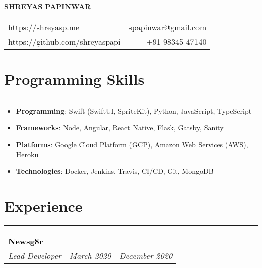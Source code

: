 \documentclass[a4paper,6pt]{article}
\begin{document}
\begin{center}
\Large \textbf{SHREYAS PAPINWAR}


\end{center}
\begin{tabularx}{\textwidth}{X r}
	https://shreyasp.me &  spapinwar@gmail.com \vspace{2px} \\
	https://github.com/shreyaspapi & +91 98345 47140 
\end{tabularx}


\vspace{-9px}
\section*{Programming Skills}
\vspace{-8px}
\hrule
\vspace{8px}
\begin{itemize}
	\item \hspace{3px} \textbf{Programming}: \small Swift (SwiftUI, SpriteKit), Python, JavaScript, TypeScript
\normalsize
\vspace{2px}
	\item \hspace{3px} \textbf{Frameworks}: \small Node, Angular, React Native, Flask, Gatsby, Sanity
\normalsize
\vspace{2px}
	\item \hspace{3px} \textbf{Platforms}: \small Google Cloud Platform (GCP), Amazon Web Services (AWS), Heroku
\normalsize
\vspace{2px}
	\item \hspace{3px} \textbf{Technologies}: \small Docker, Jenkins, Travis, CI/CD, Git, MongoDB
\normalsize
\end{itemize}


\vspace{-9px}
\section*{Experience}
\vspace{-8px}
\hrule



\vspace{7px}
\begin{tabularx}{\textwidth}{X r}
	\large{\textbf{\href{https://play.google.com/store/apps/details?id=com.Newsg8r}{\textcolor{black}{\textbf{Newsg8r}}}}} \vspace{1px} & \\
	\textit{\small Lead Developer}& \textit{March 2020 - December 2020} \\
\end{tabularx}
\end{document}
